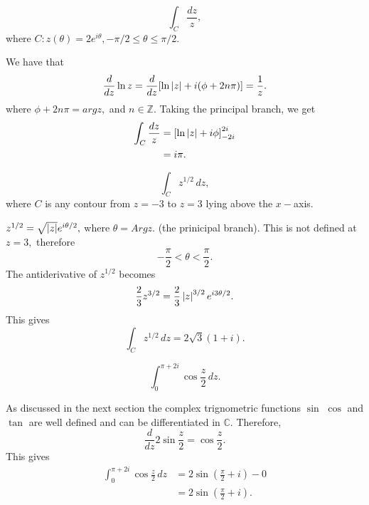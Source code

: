 \documentclass[12pt]{book}
\begin{document}
\begin{exmp}
    \[
        \int_{C} \frac{dz}{z},
    \]
    where $C: z(\theta) = 2e^{i\theta}, -\pi/2 \leq \theta \leq \pi/2.$
\end{exmp}
We have that 
\[
    \frac{d}{dz}\ln z = \frac{d}{dz}[\ln\left\lvert z \right\rvert + i(\phi + 2n\pi)] = \frac{1}{z}.
\]
where $\phi + 2n\pi = arg z,$ and $n \in \mathbb{Z}.$  Taking the principal branch, we get
\begin{align*}
    \int_{C} \frac{dz}{z}
        &=
           \left[ \ln\left\lvert z \right\rvert + i\phi \right]_{-2i}^{2i} \\
        &=
            i\pi.
\end{align*}

\begin{exmp}
    \[
        \int_{C} z^{1/2}\,dz,
    \]
    where $C$ is any contour from $z = -3$ to $z = 3$ lying above the $x-$axis.
\end{exmp}
$z^{1/2} = \sqrt{\left\lvert z \right\rvert}e^{i\theta / 2},$ where $\theta = Arg z.$ (the prinicipal branch). This is not defined at $z = 3,$ therefore
\[
    -\frac{\pi}{2} < \theta < \frac{\pi}{2}.
\]
The antiderivative of $z^{1/2}$ becomes 
\[
    \frac{2}{3} z^{3/2} = \frac{2}{3}\left\lvert z \right\rvert^{3/2}e^{i3\theta/2}.
\]
This gives 
\[
    \int_{C} z^{1/2}\,dz = 2\sqrt{3}(1 + i).
\]

\begin{exmp}
    \[
        \int_{0}^{\pi + 2i} \cos\frac{z}{2}\,dz.
    \]
\end{exmp}
As discussed in the next section the complex trignometric functions $\sin$ $\cos$ and $\tan$ are well defined and can be differentiated in $\mathbb{C}.$ Therefore, 
\[
    \frac{d}{dz} 2\sin\frac{z}{2} = \cos\frac{z}{2}.
\]
This gives
\begin{align*}
    \int_{0}^{\pi + 2i} \cos\frac{z}{2}\,dz
        &=
            2\sin\left(\frac{\pi}{2} + i\right) - 0 \\
        &=
            2\sin\left(\frac{\pi}{2} + i\right).
\end{align*}
\end{document}
